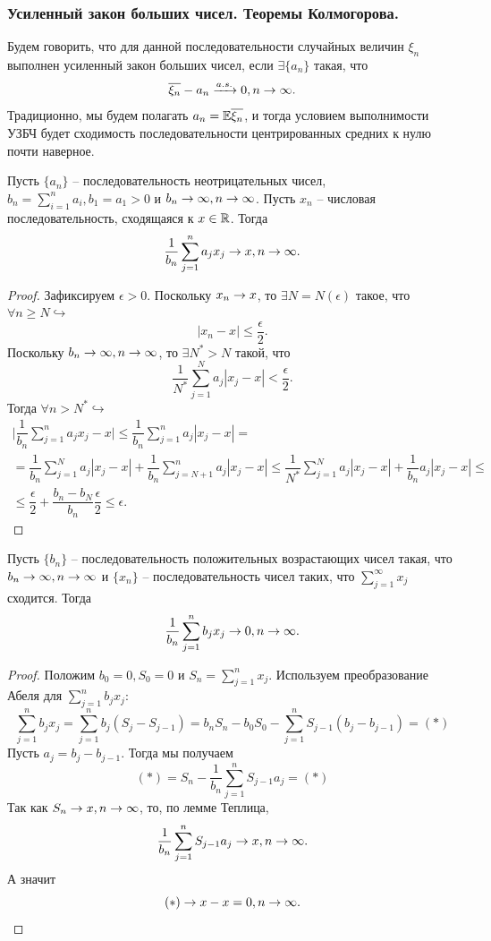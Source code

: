 \subsubsection{Усиленный закон больших чисел. Теоремы Колмогорова.}
Будем говорить, что для данной последовательности случайных величин $\xi_n$ выполнен усиленный закон больших чисел, если $\exists \{a_n\}$ такая, что
\[
    \overline{\xi_n} - a_n \xrightarrow{a.s.} 0, n \rightarrow \infty.
\]
Традиционно, мы будем полагать $a_n = \mathbb{E} \overline{\xi_n}$, и тогда условием выполнимости УЗБЧ будет сходимость последовательности центрированных средних к нулю почти наверное.
\begin{lemma}[Теплиц]
    Пусть $\{a_n\}$ -- последовательность неотрицательных чисел, $b_n = \sum_{i = 1}^n a_i, b_1 = a_1 > 0$ и $b_n \rightarrow \infty, n \rightarrow \infty$. Пусть $x_n$ -- числовая последовательность, сходящаяся к $x \in \mathbb{R}$. Тогда
    \[
        \dfrac{1}{b_n}\sum\limits_{j = 1}^{n} a_j x_j \rightarrow x, n \rightarrow \infty.
    \]
\end{lemma}
\begin{proof}
    Зафиксируем $\epsilon > 0$. Поскольку $x_n \rightarrow x$, то $\exists N = N(\epsilon)$ такое, что $\forall n \geq N \hookrightarrow$
    \[
        |x_n - x| \leq \dfrac{\epsilon}{2}.
    \]
    Поскольку $b_n \rightarrow \infty, n \rightarrow \infty$, то $\exists N^* > N$ такой, что 
    \[
        \dfrac{1}{N^*}\sum\limits_{j = 1}^N a_j|x_j - x| < \dfrac{\epsilon}{2}.
    \]
    Тогда $\forall n > N^* \hookrightarrow$
    \begin{multline*}
        \biggr|\dfrac{1}{b_n} \sum\limits_{j = 1}^n a_jx_j - x\biggr| \leq \dfrac{1}{b_n} \sum\limits_{j = 1}^n a_j|x_j - x| = \\ = \dfrac{1}{b_n}\sum\limits_{j = 1}^{N} a_j|x_j - x| + \dfrac{1}{b_n}\sum\limits_{j = N + 1}^n a_j|x_j - x| \leq \dfrac{1}{N^*}\sum\limits_{j = 1}^N a_j|x_j - x| + \dfrac{1}{b_n} a_j|x_j - x| \leq \\ \leq  \dfrac{\epsilon}{2} + \dfrac{b_n - b_N}{b_n}\dfrac{\epsilon}{2} \leq \epsilon.
    \end{multline*}
\end{proof}
\begin{lemma}[Кронекер]
    Пусть $\{b_n\}$ -- последовательность положительных возрастающих чисел такая, что $b_n \rightarrow \infty, n \rightarrow \infty$ и $\{x_n\}$ -- последовательность чисел таких, что $\sum_{j = 1}^\infty x_j$ сходится. Тогда
    \[
        \dfrac{1}{b_n}\sum\limits_{j = 1}^n b_j x_j \rightarrow 0, n \rightarrow \infty.
    \]
\end{lemma}
\begin{proof}
    Положим $b_0  = 0, S_0 = 0$ и $S_n = \sum_{j = 1}^n x_j$. Используем преобразование Абеля для $\sum_{j = 1}^n b_jx_j$:
    \[
        \sum\limits_{j = 1}^n b_j x_j = \sum\limits_{j = 1}^{n} b_j(S_j - S_{j - 1}) = b_nS_n - b_0S_0 - \sum\limits_{j = 1}^n S_{j - 1}(b_j - b_{j - 1}) = (*)
    \]
    Пусть $a_j = b_j - b_{j - 1}$. Тогда мы получаем
    \[
        (*) = S_n - \dfrac{1}{b_n}\sum\limits_{j = 1}^{n} S_{j - 1} a_j = (*)
    \]
    Так как $S_n \rightarrow x, n \rightarrow \infty$, то, по лемме Теплица,
    \[
        \dfrac{1}{b_n}\sum\limits_{j = 1}^{n} S_{j - 1}a_j \rightarrow x, n \rightarrow \infty.
    \]
    А значит
    \[
        (*) \rightarrow x - x = 0, n \rightarrow \infty.
    \]
\end{proof}
